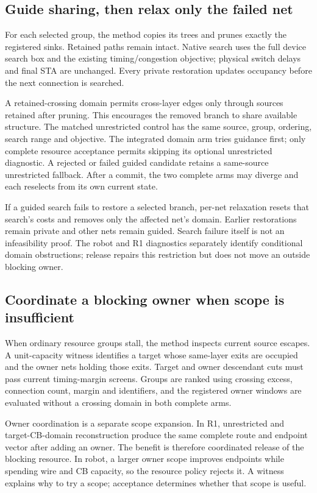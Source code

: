 \documentclass[conference,10pt]{IEEEtran}
\begin{document}
\subsection{Guide sharing, then relax only the failed net}
For each selected group, the method copies its trees and prunes exactly the registered sinks. Retained paths remain intact. Native search uses the full device search box and the existing timing/congestion objective; physical switch delays and final STA are unchanged. Every private restoration updates occupancy before the next connection is searched.

A retained-crossing domain permits cross-layer edges only through sources retained after pruning. This encourages the removed branch to share available structure. The matched unrestricted control has the same source, group, ordering, search range and objective. The integrated domain arm tries guidance first; only complete resource acceptance permits skipping its optional unrestricted diagnostic. A rejected or failed guided candidate retains a same-source unrestricted fallback. After a commit, the two complete arms may diverge and each reselects from its own current state.

If a guided search fails to restore a selected branch, per-net relaxation resets that search's costs and removes only the affected net's domain. Earlier restorations remain private and other nets remain guided. Search failure itself is not an infeasibility proof. The robot and R1 diagnostics separately identify conditional domain obstructions; release repairs this restriction but does not move an outside blocking owner.

\subsection{Coordinate a blocking owner when scope is insufficient}
When ordinary resource groups stall, the method inspects current source escapes. A unit-capacity witness identifies a target whose same-layer exits are occupied and the owner nets holding those exits. Target and owner descendant cuts must pass current timing-margin screens. Groups are ranked using crossing excess, connection count, margin and identifiers, and the registered owner windows are evaluated without a crossing domain in both complete arms.

Owner coordination is a separate scope expansion. In R1, unrestricted and target-CB-domain reconstruction produce the same complete route and endpoint vector after adding an owner. The benefit is therefore coordinated release of the blocking resource. In robot, a larger owner scope improves endpoints while spending wire and CB capacity, so the resource policy rejects it. A witness explains why to try a scope; acceptance determines whether that scope is useful.
\end{document}
